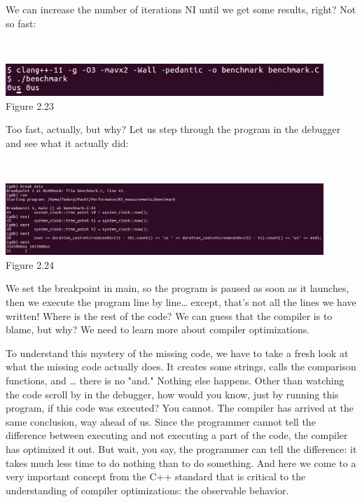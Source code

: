 We can increase the number of iterations NI until we get some results, right? Not so fast:

\hspace*{\fill} \\ %
\begin{center}
\includegraphics[width=0.9\textwidth]{content/1/chapter2/images/23.jpg}\\
Figure 2.23
\end{center}

Too fast, actually, but why? Let us step through the program in the debugger and see what it actually did:

\hspace*{\fill} \\ %
\begin{center}
\includegraphics[width=0.9\textwidth]{content/1/chapter2/images/24.jpg}\\
Figure 2.24
\end{center}

We set the breakpoint in main, so the program is paused as soon as it launches, then we execute the program line by line… except, that's not all the lines we have written! Where is the rest of the code? We can guess that the compiler is to blame, but why? We need to learn more about compiler optimizations.


To understand this mystery of the missing code, we have to take a fresh look at what the missing code actually does. It creates some strings, calls the comparison functions, and … there is no "and." Nothing else happens. Other than watching the code scroll by in the debugger, how would you know, just by running this program, if this code was executed? You cannot. The compiler has arrived at the same conclusion, way ahead of us. Since the programmer cannot tell the difference between executing and not executing a part of the code, the compiler has optimized it out. But wait, you say, the programmer can tell the difference: it takes much less time to do nothing than to do something. And here we come to a very important concept from the C++ standard that is critical to the understanding of compiler optimizations: the observable behavior.

